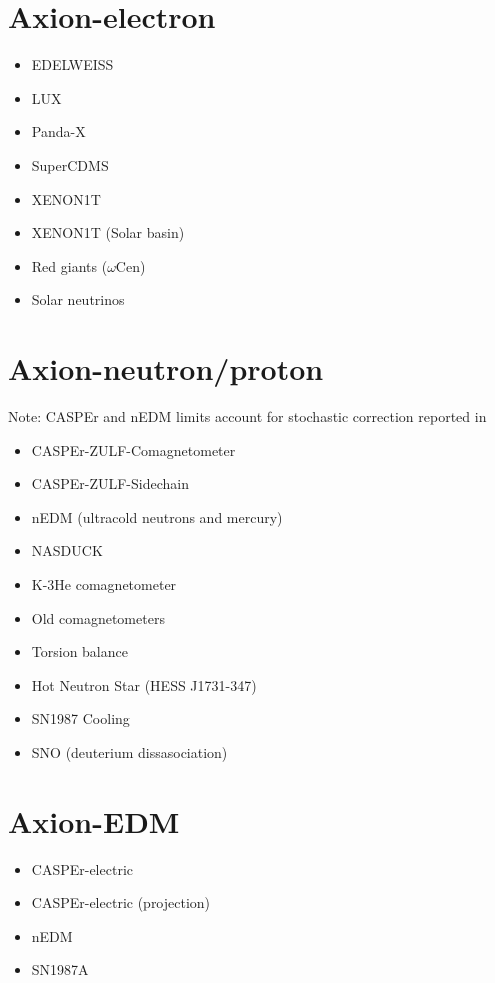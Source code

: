 \documentclass[10pt,twocolumn]{article}
\begin{document}
\section{Axion-electron}
\begin{itemize}\setlength\itemsep{-0.5em}
    \item EDELWEISS~\cite{EDELWEISS:2018tde}
    \item LUX~\cite{LUX:2017glr}
    \item Panda-X~\cite{PandaX:2017ock}
    \item SuperCDMS~\cite{SuperCDMS:2019jxx}
    \item XENON1T~\cite{XENON:2019gfn,XENON:2020rca}
    \item XENON1T (Solar basin)~\cite{VanTilburg:2020jvl}
    \item Red giants ($\omega$Cen)~\cite{Capozzi:2020cbu}
    \item Solar neutrinos~\cite{Gondolo:2008dd}
\end{itemize}


\section{Axion-neutron/proton}
Note: CASPEr and nEDM limits account for stochastic correction reported in~\cite{Centers:2019dyn}
\begin{itemize}\setlength\itemsep{-0.5em}
    \item CASPEr-ZULF-Comagnetometer~\cite{Wu:2019exd}
    \item CASPEr-ZULF-Sidechain~\cite{Garcon:2019inh}
    \item nEDM (ultracold neutrons and mercury)~\cite{Abel:2017rtm}
    \item NASDUCK~\cite{Bloch:2021vnn}
    \item K-3He comagnetometer~\cite{Vasilakis2009}
    \item Old comagnetometers~\cite{Bloch:2019lcy}
    \item Torsion balance~\cite{Adelberger:2006dh}
    \item Hot Neutron Star (HESS J1731-347)~\cite{Beznogov:2018fda}
    \item SN1987 Cooling~\cite{Carenza:2019pxu}
    \item SNO (deuterium dissasociation)~\cite{Bhusal:2020bvx}
\end{itemize}

\section{Axion-EDM}
\begin{itemize}\setlength\itemsep{-0.5em}
	\item CASPEr-electric~\cite{Aybas:2021nvn}
	\item CASPEr-electric (projection)~\cite{JacksonKimball:2017elr}
	\item nEDM~\cite{Chang:2017ruk}
	\item SN1987A~\cite{Graham:2013gfa}
\end{itemize}
\end{document}
